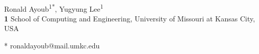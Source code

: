 \documentclass[10pt,letterpaper]{article}
\begin{document}
\vspace*{0.2in}

\begin{flushleft}
{\Large
\textbf{} %
}
\newline
\\
Ronald Ayoub\textsuperscript{1*},
Yugyung Lee\textsuperscript{1}
\\
\bigskip
\textbf{1} School of Computing and Engineering, University of Missouri at Kansas City, USA
\\
\bigskip

% 
%





* ronaldayoub@mail.umkc.edu

\end{flushleft}
\end{document}
